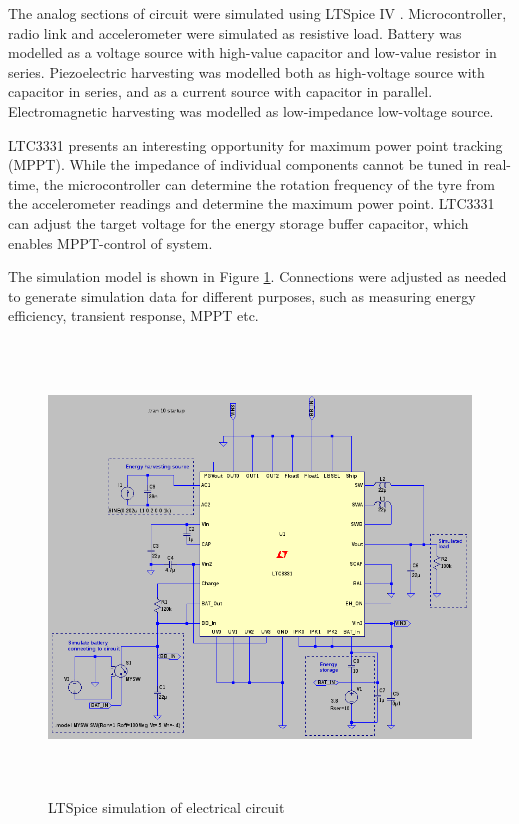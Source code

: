 The analog sections of circuit were simulated using LTSpice IV \cite{ltspice}. Microcontroller, radio link and accelerometer were simulated as resistive load. Battery was modelled as a voltage source with high-value capacitor and low-value resistor in series. Piezoelectric harvesting was modelled both as high-voltage source with capacitor in series, and as a current source with capacitor in parallel. Electromagnetic harvesting was modelled as low-impedance low-voltage source. 

LTC3331 presents an interesting opportunity for maximum power point tracking (MPPT). While the impedance of individual components cannot be tuned in real-time, the microcontroller can determine the rotation frequency of the tyre from the accelerometer readings and determine the maximum power point. LTC3331 can adjust the target voltage for the energy storage buffer capacitor, which enables MPPT-control of system.

The simulation model is shown in Figure \ref{fig:ltspice_sim}. Connections were adjusted as needed to generate simulation data for different purposes, such as measuring energy efficiency, transient response, MPPT etc.

\begin{figure}[htb]
\begin{center}
\includegraphics[height=12cm]{images/own_dwg/ltspice_ltc3331.jpg}
\end{center}
\caption{\label{fig:ltspice_sim} LTSpice \cite{ltspice} simulation of electrical circuit}
\end{figure}

